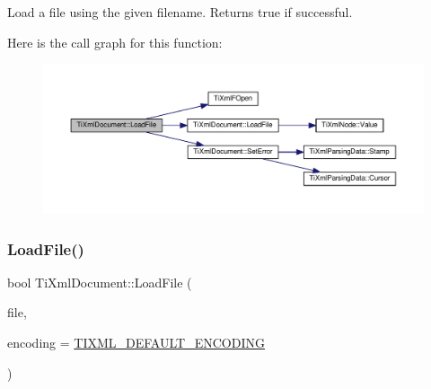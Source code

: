 Load a file using the given filename. Returns true if successful. 

Here is the call graph for this function\+:\nopagebreak
\begin{figure}[H]
\begin{center}
\leavevmode
\includegraphics[width=350pt]{class_ti_xml_document_a879cdf5e981b8b2d2ef82f2546dd28fb_cgraph}
\end{center}
\end{figure}
\mbox{\label{class_ti_xml_document_a41f6fe7200864d1dca663d230caf8db6}} 
\subsubsection{\texorpdfstring{Load\+File()}{LoadFile()}\hspace{0.1cm}{\footnotesize\ttfamily [3/3]}}
{\footnotesize\ttfamily bool Ti\+Xml\+Document\+::\+Load\+File (\begin{DoxyParamCaption}\item[{F\+I\+LE $\ast$}]{file,  }\item[{\hyperlink{tinyxml_8h_a88d51847a13ee0f4b4d320d03d2c4d96}{Ti\+Xml\+Encoding}}]{encoding = {\ttfamily \hyperlink{tinyxml_8h_ad5b8b092878e9010d6400cb6c13d4879}{T\+I\+X\+M\+L\+\_\+\+D\+E\+F\+A\+U\+L\+T\+\_\+\+E\+N\+C\+O\+D\+I\+NG}} }\end{DoxyParamCaption})}

